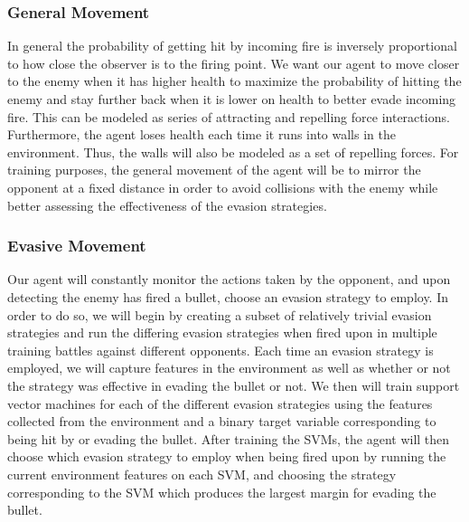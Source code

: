 \documentclass{article}
\theoremstyle{plain}
\theoremstyle{definition}
\theoremstyle{remark}
\begin{document}


\subsubsection*{General Movement }
In general the probability of getting hit by incoming fire is inversely proportional to how close the observer is to the firing point. We want our agent to move closer to the enemy when it has higher health to maximize the probability of hitting the enemy and stay further back when it is lower on health to better evade incoming fire. This can be modeled as series of attracting and repelling force interactions. Furthermore, the agent loses health each time it runs into walls in the environment. Thus, the walls will also be modeled as a set of repelling forces. For training purposes, the general movement of the agent will be to mirror the opponent at a fixed distance in order to avoid collisions with the enemy while better assessing the effectiveness of the evasion strategies. 

\subsubsection*{Evasive Movement }
Our agent will constantly monitor the actions taken by the opponent, and upon detecting the enemy has fired a bullet, choose an evasion strategy to employ. In order to do so, we will begin by creating a subset of relatively trivial evasion strategies and run the differing evasion strategies when fired upon in multiple training battles against different opponents. Each time an evasion strategy is employed, we will capture features in the environment as well as whether or not the strategy was effective in evading the bullet or not. We then will train support vector machines for each of the different evasion strategies using the features collected from the environment and a binary target variable corresponding to being hit by or evading the bullet. After training the SVMs, the agent will then choose which evasion strategy to employ when being fired upon by running the current environment features on each SVM, and choosing the strategy corresponding to the SVM which produces the largest margin for evading the bullet. 
\end{document}

